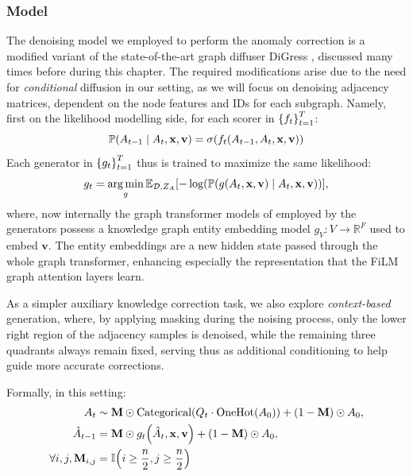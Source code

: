 \subsubsection{Model}
The denoising model we employed to perform the anomaly correction is a modified variant of the state-of-the-art graph diffuser DiGress \cite{vignac_digress_2022}, discussed many times before during this chapter. The required modifications arise due to the need for \emph{conditional} diffusion in our setting, as we will focus on denoising adjacency matrices, dependent on the node features and IDs for each subgraph. 
Namely, first on the likelihood modelling side, for each scorer in $\mathopen{}\left\{f_t\right\}_{t=1}^T$:
\begin{equation}
    \mathbb{P}\mathopen{}\left(A_{t-1} \mid A_t, \mathbf{x}, \mathbf{v}\right)=\sigma\mathopen{}\left(f_t\mathopen{}\left(A_{t-1},A_t,\mathbf{x}, \mathbf{v}\right)\right)
\end{equation}
Each generator in $\mathopen{}\left\{g_t\right\}_{t=1}^T$ thus is trained to maximize the same likelihood:
\begin{equation}
    g_t=\operatorname*{arg\,min}_g{\mathbb{E}_{\mathcal{D},Z_A}\mathopen{}\left[-\log\mathopen{}\left(\mathbb{P}\mathopen{}\left(g\mathopen{}\left(A_t, \mathbf{x}, \mathbf{v}\right) \mid A_t, \mathbf{x}, \mathbf{v}\right)\right)\right]},
\end{equation}
where, now internally the graph transformer models of \cite{dwivedi_generalization_2021} employed by the generators possess a knowledge graph entity embedding model $g_V:V\to\mathbb{R}^F$ used to embed $\mathbf{v}$. The entity embeddings are a new hidden state passed through the whole graph transformer, enhancing especially the representation that the FiLM \cite{perez_film_2018} graph attention layers learn.

As a simpler auxiliary knowledge correction task, we also explore \emph{context-based} generation, where, by applying masking during the noising process, only the lower right region of the adjacency samples is denoised, while the remaining three quadrants always remain fixed, serving thus as additional conditioning to help guide more accurate corrections. 

Formally, in this setting:
\begin{align}
    \begin{split}
        A_t &\sim \mathbf{M} \odot \text{Categorical}\mathopen{}\left(Q_t \cdot \text{OneHot}\mathopen{}\left(A_0\right)\right) + \mathopen{}\left(1-\mathbf{M}\right) \odot A_0, \\
        \hat{A}_{t-1} &= \mathbf{M} \odot g_t\mathopen{}\left(\hat{A}_t,\mathbf{x},\mathbf{v}\right) + \mathopen{}\left(1-\mathbf{M}\right) \odot A_0, \\
        \forall i,j, \mathbf{M}_{i,j}&=\mathbb{I}\mathopen{}\left(i \geq \frac{n}{2}, j \geq \frac{n}{2}\right)
    \end{split}
\end{align}

